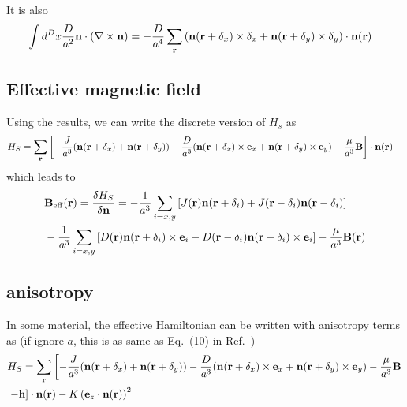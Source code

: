 \documentclass[aps,superscriptaddress,groupedaddress]{revtex4}  %
\begin{document}
It is also
\begin{equation}
\begin{split}
&\int d^D x\frac{D}{a^2}{\bf n}\cdot (\nabla \times {\bf n})=-\frac{D}{a^4}\sum _{{\bf r}}\left({\bf n}({\bf r}+\delta _x)\times \delta _x+{\bf n}({\bf r}+\delta _y)\times \delta _y\right)\cdot {\bf n}({\bf r})
\end{split}
\end{equation}

\subsection{\label{sec:2.4}Effective magnetic field}

Using the results, we can write the discrete version of $H_s$ as
\begin{equation}
\begin{split}
&H_S=\sum _{{\bf r}}\left[-\frac{J}{a^3} ({\bf n}({\bf r}+\delta_x)+{\bf n}({\bf r}+\delta_y))-\frac{D}{a^3}  ({\bf n}({\bf r}+\delta_x)\times {{\bf e}}_x+{\bf n}({\bf r}+\delta_y)\times {{\bf e}}_y)-\frac{\mu}{a^3}{\bf B}\right]\cdot {\bf n}({\bf r})
\end{split}
\end{equation}
which leads to
\begin{equation}
\begin{split}
&{\bf B}_{\rm eff}({\bf r})=\frac{\delta H_S}{\delta {\bf n}}=-\frac{1}{a^3} \sum _{i=x,y}\left[J({\bf r}){\bf n}({\bf r}+\delta_i)+J({\bf r}-\delta_i){\bf n}({\bf r}-\delta_i)\right]\\
&-\frac{1}{a^3}  \sum _{i=x,y}\left[D({\bf r}){\bf n}({\bf r}+\delta_i)\times {{\bf e}}_i-D({\bf r}-\delta _i){\bf n}({\bf r}-\delta_i)\times {{\bf e}}_i\right]-\frac{\mu}{a^3}{\bf B}({\bf r})
\end{split}
\end{equation}

\subsection{\label{sec:2.5}anisotropy}

In some material, the effective Hamiltonian can be written with anisotropy terms as (if ignore $a$, this is as same as Eq.~(10) in Ref.~\cite{spintransfer})
\begin{equation}
\begin{split}
&H_S=\sum _{{\bf r}}\left[-\frac{J}{a^3} ({\bf n}({\bf r}+\delta_x)+{\bf n}({\bf r}+\delta_y))-\frac{D}{a^3}  ({\bf n}({\bf r}+\delta_x)\times {{\bf e}}_x+{\bf n}({\bf r}+\delta_y)\times {{\bf e}}_y)-\frac{\mu}{a^3}{\bf B}\right.\\
&\left.-{\bf h}\right]\cdot {\bf n}({\bf r})-K\left({\bf e}_z\cdot {\bf n}({\bf r})\right)^2
\end{split}
\end{equation}
\end{document}
